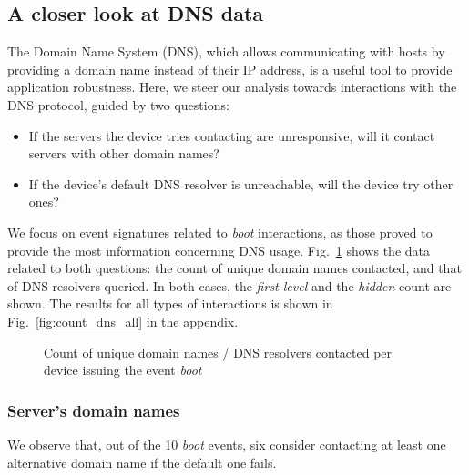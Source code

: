 \subsection{A closer look at DNS data}

The Domain Name System (DNS), which allows communicating with hosts
by providing a domain name instead of their IP address, 
is a useful tool to provide application robustness.
Here, we steer our analysis towards interactions with the DNS protocol,
guided by two questions:
\begin{itemize}
  \item If the servers the device tries contacting are unresponsive,
  will it contact servers with other domain names?
  \item If the device's default DNS resolver is unreachable,
  will the device try other ones?
\end{itemize}

We focus on event signatures related to \emph{boot} interactions,
as those proved to provide the most information concerning DNS usage.
Fig.~\ref{fig:count_dns_boot} shows the data related to both questions:
the count of unique domain names contacted,
and that of DNS resolvers queried.
In both cases, the \emph{first-level} and the \emph{hidden} count are shown.
The results for all types of interactions is shown in Fig.~\ref{fig:count_dns_all}
in the appendix.


\begin{figure}
  \centering
  \caption{Count of unique domain names / DNS resolvers contacted per device issuing the event \emph{boot}}
  \label{fig:count_dns_boot}
\end{figure}


\subsubsection{Server's domain names}

We observe that, out of the 10 \emph{boot} events,
six consider contacting at least one alternative domain name
if the default one fails.


